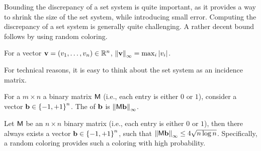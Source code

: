 Bounding the discrepancy of a set system is quite important, as it
provides a way to shrink the size of the set system, while introducing
small error. Computing the discrepancy of a set system is generally
quite challenging. A rather decent bound follows by using random
coloring. 

    
\begin{defn}
    For a vector $\mathbf{v} = (v_1,\ldots, v_n) \in \mathbb{R}^n$,
    $\left\| {\mathbf{v}} \right\|_\infty = \max_{i} \left| {v_i} \right|$.
\end{defn}

For technical reasons, it is easy to think about the set
system as an incidence matrix.

\begin{defn}       
    For a $m \times n$ a binary matrix $\mathsf{M}$ (i.e., each entry is
    either $0$ or $1$), consider a vector $\mathbf{b} \in \left\{ {-1,
       +1} \right\}^n$. The  of $\mathbf{b}$ is
    $\left\| {\mathsf{M} \mathbf{b}} \right\|_\infty$.
\end{defn}


\begin{theorem}
    Let $\mathsf{M}$ be an $n \times n$ binary matrix (i.e., each entry
    is either $0$ or $1$), then there always exists a vector
    $\mathbf{b} \in \left\{ {-1, +1} \right\}^n$, such that
    $\left\| {\mathsf{M} \mathbf{b}} \right\|_\infty \leq 4 \sqrt{n \log
       n}$. Specifically, a random coloring provides such a coloring
    with high probability.
\end{theorem}

